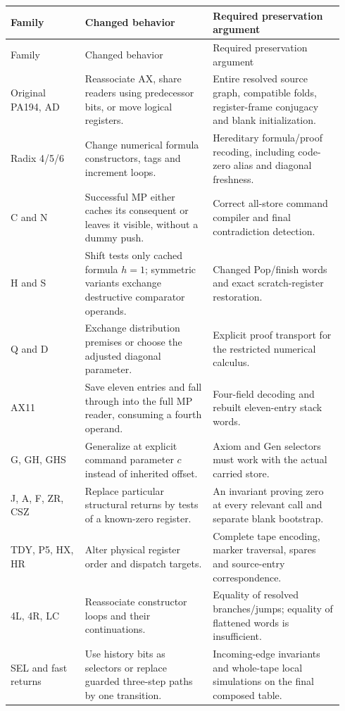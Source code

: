 \documentclass[11pt,letterpaper]{article}
\begin{document}
\begin{longtable}{@{}>{\raggedright\arraybackslash}p{0.21\linewidth}>{\raggedright\arraybackslash}p{0.36\linewidth}>{\raggedright\arraybackslash}p{0.37\linewidth}@{}}
\toprule Family & Changed behavior & Required preservation argument\\\midrule\endfirsthead
\toprule Family & Changed behavior & Required preservation argument\\\midrule\endhead
Original PA194, AD & Reassociate AX, share readers using predecessor bits, or move logical registers. & Entire resolved source graph, compatible folds, register-frame conjugacy and blank initialization.\\[4pt]
Radix 4/5/6 & Change numerical formula constructors, tags and increment loops. & Hereditary formula/proof recoding, including code-zero alias and diagonal freshness.\\[4pt]
C and N & Successful MP either caches its consequent or leaves it visible, without a dummy push. & Correct all-store command compiler and final contradiction detection.\\[4pt]
H and S & Shift tests only cached formula $h=1$; symmetric variants exchange destructive comparator operands. & Changed Pop/finish words and exact scratch-register restoration.\\[4pt]
Q and D & Exchange distribution premises or choose the adjusted diagonal parameter. & Explicit proof transport for the restricted numerical calculus.\\[4pt]
AX11 & Save eleven entries and fall through into the full MP reader, consuming a fourth operand. & Four-field decoding and rebuilt eleven-entry stack words.\\[4pt]
G, GH, GHS & Generalize at explicit command parameter $c$ instead of inherited offset. & Axiom and Gen selectors must work with the actual carried store.\\[4pt]
J, A, F, ZR, CSZ & Replace particular structural returns by tests of a known-zero register. & An invariant proving zero at every relevant call and separate blank bootstrap.\\[4pt]
TDY, P5, HX, HR & Alter physical register order and dispatch targets. & Complete tape encoding, marker traversal, spares and source-entry correspondence.\\[4pt]
4L, 4R, LC & Reassociate constructor loops and their continuations. & Equality of resolved branches/jumps; equality of flattened words is insufficient.\\[4pt]
SEL and fast returns & Use history bits as selectors or replace guarded three-step paths by one transition. & Incoming-edge invariants and whole-tape local simulations on the final composed table.\\
\bottomrule
\end{longtable}
\end{document}
